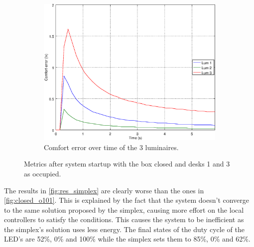 \begin{figure}[ht]
\begin{subfigure}[t]{0.32\textwidth}
    \centering
    \includegraphics[width=.95\textwidth]{img/n_closed_o101}
    \caption{Comfort error over time of the 3 luminaires.}
    \label{fig:n_closed_o101}
    \end{subfigure}
    \caption{Metrics after system startup with the box closed and desks 1 and 3 as occupied.}
    \label{fig:closed_o101}
\end{figure}

The results in \autoref{fig:res_simplex}  are clearly worse than the ones in \autoref{fig:closed_o101}. This is explained by the fact that the system doesn't converge to the same solution proposed by the simplex, causing more effort on the local controllers to satisfy the conditions. This causes the system to be inefficient as the simplex's solution uses less energy. The final states of the duty cycle of the LED's are 52\%, 0\% and 100\% while the simplex sets them to 85\%, 0\% and 62\%.

